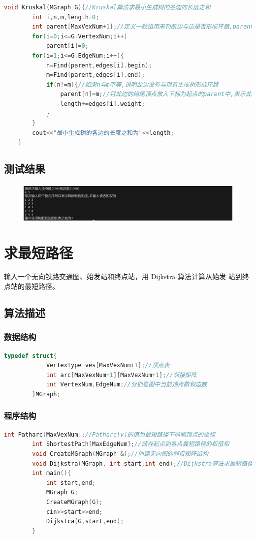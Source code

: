 \documentclass{ctexart}
\begin{document}
	\begin{lstlisting}[language=C++, caption=Kruskal算法求最小生成树的各边的长度之和]
		void Kruskal(MGraph G){//Kruskal算法求最小生成树的各边的长度之和
		int i,n,m,length=0;
		int parent[MaxVexNum+1];//定义一数组用来判断边与边是否形成环路,parent[m]=n表示m与n在同一集合中，而不是表示m和n之间有边
		for(i=0;i<=G.VertexNum;i++)
			parent[i]=0;
		for(i=1;i<=G.EdgeNum;i++){
			n=Find(parent,edges[i].begin);
			m=Find(parent,edges[i].end);
			if(n!=m){//如果n与m不等,说明此边没有与现有生成树形成环路
				parent[n]=m;//将此边的结尾顶点放入下标为起点的parent中,表示此顶点已经在生成树集合中
				length+=edges[i].weight;
			}
		}
		cout<<"最小生成树的各边的长度之和为"<<length;
	}
	\end{lstlisting}
	\subsection{测试结果}
	\begin{figure}[H]
		\centering 
		\includegraphics[height=2cm,width=12cm]{2.png}
		\end{figure}
	\section{求最短路径}
	输入一个无向铁路交通图、始发站和终点站，用 Dijkstra 算法计算从始发
站到终点站的最短路径。
	\subsection{算法描述}
	\subsubsection{数据结构}
	\begin{lstlisting}[language=C++, caption=数据结构]
		typedef struct{
			VertexType ves[MaxVexNum+1];//顶点表
			int arc[MaxVexNum+1][MaxVexNum+1];//邻接矩阵
			int VertexNum,EdgeNum;//分别是图中当前顶点数和边数
		}MGraph;
	\end{lstlisting}
	

	\subsubsection{程序结构}
	\begin{lstlisting}[language=C++, caption=程序结构]
		int Patharc[MaxVexNum];//Patharc[v]的值为最短路径下前驱顶点的坐标
		int ShortestPath[MaxEdgeNum];//储存起点到各点最短路径的权值和
		void CreateMGraph(MGraph &);//创建无向图的邻接矩阵结构
		void Dijkstra(MGraph, int start,int end);//Dijkstra算法求最短路径
		int main(){
			int start,end;
			MGraph G;
			CreateMGraph(G);
			cin>>start>>end;
			Dijkstra(G,start,end);
		}
	\end{lstlisting}
\end{document}
